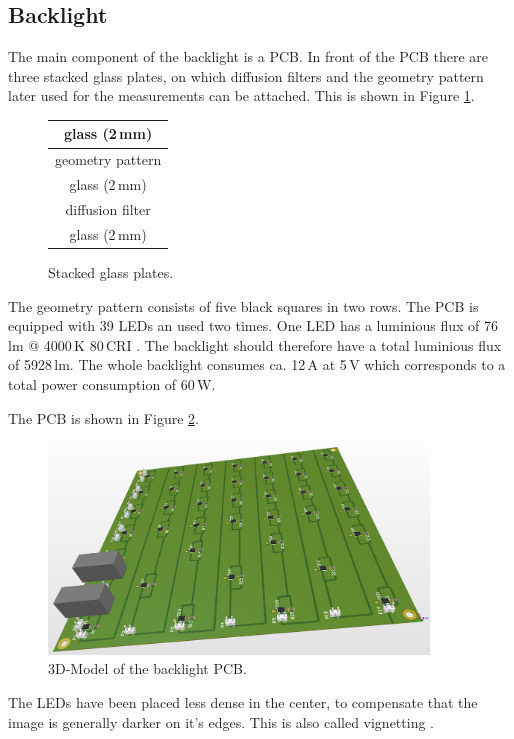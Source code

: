 \subsection{Backlight}
The main component of the backlight is a PCB.
In front of the PCB there are three stacked glass plates, on which diffusion filters and the geometry pattern later used for the measurements can be attached.
This is shown in Figure \ref{development:glass}.
\begin{figure}[ht]
	\centering
	\setlength{\tabcolsep}{12em}
	{\renewcommand{\arraystretch}{1}	
	\begin{tabular}{|c|}
		\hline
		\multicolumn{1}{|c|}{glass (2\,mm)}\\
		\hline
		\multicolumn{1}{|c|}{geometry pattern}\\
		\hline
		\multicolumn{1}{|c|}{glass (2\,mm)}\\
		\hline
		\multicolumn{1}{|c|}{diffusion filter}\\
		\hline
		\multicolumn{1}{|c|}{glass (2\,mm)}\\
		\hline
	\end{tabular}
	}
	\caption{Stacked glass plates.\label{development:glass}}
\end{figure}

The geometry pattern consists of five black squares in two rows.
The PCB is equipped with 39 LEDs an used two times.
One LED has a luminious flux of 76\,lm @ 4000\,K 80\,CRI \cite{led}.
The backlight should therefore have a total luminious flux of 5928\,lm.
The whole backlight consumes ca. 12\,A at 5\,V which corresponds to a total power consumption of 60\,W. 

The PCB is shown in Figure \ref{development:pcb}.
\begin{figure}[ht]
	\centering
	\includegraphics[width=0.9\textwidth]{3-development/images/Backlight.png}
	\caption{3D-Model of the backlight PCB.\label{development:pcb}}
\end{figure} 
The LEDs have been placed less dense in the center, to compensate that the image is generally darker on it's edges.
This is also called vignetting \cite{vignetting}.

